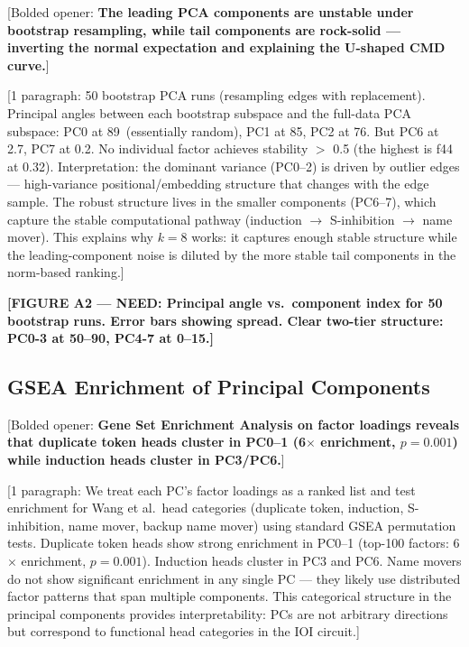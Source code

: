\documentclass[11pt]{article}
\begin{document}
[Bolded opener: \textbf{The leading PCA components are unstable under
bootstrap resampling, while tail components are rock-solid ---
inverting the normal expectation and explaining the U-shaped CMD curve.}]

[1 paragraph: 50 bootstrap PCA runs (resampling edges with replacement).
Principal angles between each bootstrap subspace and the full-data PCA
subspace: PC0 at 89\textdegree\ (essentially random), PC1 at 85\textdegree,
PC2 at 76\textdegree. But PC6 at 2.7\textdegree, PC7 at 0.2\textdegree.
No individual factor achieves stability $>$ 0.5 (the highest is f44 at
0.32). Interpretation: the dominant variance (PC0--2) is driven by
outlier edges --- high-variance positional/embedding structure that
changes with the edge sample. The robust structure lives in the
smaller components (PC6--7), which capture the stable computational
pathway (induction $\to$ S-inhibition $\to$ name mover). This explains
why $k=8$ works: it captures enough stable structure while the
leading-component noise is diluted by the more stable tail components
in the norm-based ranking.]

\textbf{[FIGURE A2 --- NEED: Principal angle vs.\ component index for
50 bootstrap runs. Error bars showing spread. Clear two-tier structure:
PC0-3 at 50--90\textdegree, PC4-7 at 0--15\textdegree.]}

\subsection{GSEA Enrichment of Principal Components}

[Bolded opener: \textbf{Gene Set Enrichment Analysis on factor loadings
reveals that duplicate token heads cluster in PC0--1 (6$\times$
enrichment, $p = 0.001$) while induction heads cluster in PC3/PC6.}]

[1 paragraph: We treat each PC's factor loadings as a ranked list and
test enrichment for Wang et al.\ head categories (duplicate token,
induction, S-inhibition, name mover, backup name mover) using standard
GSEA permutation tests. Duplicate token heads show strong enrichment in
PC0--1 (top-100 factors: 6$\times$ enrichment, $p = 0.001$). Induction
heads cluster in PC3 and PC6. Name movers do not show significant
enrichment in any single PC --- they likely use distributed factor
patterns that span multiple components. This categorical structure in
the principal components provides interpretability: PCs are not arbitrary
directions but correspond to functional head categories in the IOI circuit.]
\end{document}
